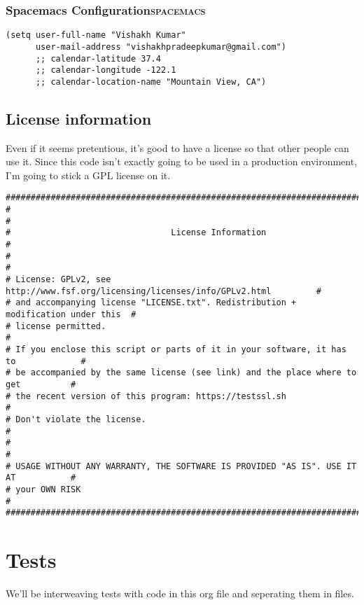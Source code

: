 \documentclass[11pt]{article}
\begin{document}
\subsubsection{Spacemacs Configuration\hfill{}\textsc{spacemacs}}
\label{sec:orge71ed62}
\begin{verbatim}
(setq user-full-name "Vishakh Kumar"
      user-mail-address "vishakhpradeepkumar@gmail.com")
      ;; calendar-latitude 37.4
      ;; calendar-longitude -122.1
      ;; calendar-location-name "Mountain View, CA")
\end{verbatim}

\subsection{License information}
\label{sec:orge930583}
Even if it seems pretentious, it's good to have a license so that other people can use it. Since this code isn't exactly going to be used in a production environment, I'm going to stick a GPL license on it.

\begin{verbatim}
#####################################################################################
#                                                                                   #
#                                License Information                                #
#                                                                                   #
# License: GPLv2, see http://www.fsf.org/licensing/licenses/info/GPLv2.html         #
# and accompanying license "LICENSE.txt". Redistribution + modification under this  #
# license permitted.                                                                #
# If you enclose this script or parts of it in your software, it has to             #
# be accompanied by the same license (see link) and the place where to get          #
# the recent version of this program: https://testssl.sh                            #
# Don't violate the license.                                                        #
#                                                                                   #
# USAGE WITHOUT ANY WARRANTY, THE SOFTWARE IS PROVIDED "AS IS". USE IT AT           #
# your OWN RISK                                                                     #
#####################################################################################
\end{verbatim}

\section{Tests}
\label{sec:org4ba750a}
We'll be interweaving tests with code in this org file and seperating them in files. 
\end{document}
